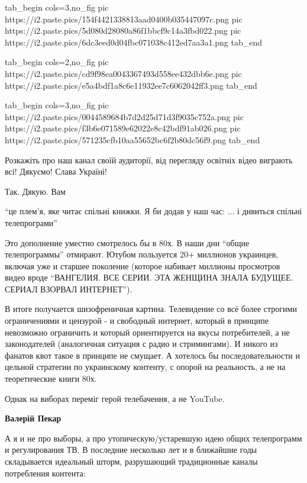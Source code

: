 \begin{itemize}
\ifcmt
  tab_begin cols=3,no_fig
     pic https://i2.paste.pics/154f4421338813aad0400b035447097c.png
		 pic https://i2.paste.pics/5d080d28080a86f1bbcf9c14a3fbd022.png
		 pic https://i2.paste.pics/6dc3eed0d04fbc071038c412ed7aa3a1.png
  tab_end
\fi

\ifcmt
  tab_begin cols=2,no_fig
	   pic https://i2.paste.pics/cd9f98ea0043367493d558ee432dbb6e.png
		 pic https://i2.paste.pics/e5a4bdf1a8c6e11932ee7c6062042ff3.png
  tab_end
\fi

\ifcmt
  tab_begin cols=3,no_fig
		 pic https://i2.paste.pics/0044589684b7d2d25d71d3f9035c752a.png
		 pic https://i2.paste.pics/f3b6e071589e62022e8c42bdf91ab026.png
		 pic https://i2.paste.pics/571235cfb10aa55652bc6f2b80dc56f9.png
  tab_end
\fi

Розкажіть про наш канал своїй аудиторії, від перегляду освітніх відео виграють всі!
Дякуємо!
Слава Україні!

Так. Дякую. Вам


\enquote{це плем'я, яке читає спільні книжки. Я би додав у наш час: ... і дивиться
спільні телепрограми}

Это дополнение уместно смотрелось бы в 80х. В наши дни \enquote{общие телепрограммы}
отмирают. Ютубом пользуется 20+ миллионов украинцев, включая уже и старшее
поколение (которое набивает миллионы просмотров видео вроде \enquote{ВАНГЕЛИЯ. ВСЕ
СЕРИИ. ЭТА ЖЕНЩИНА ЗНАЛА БУДУЩЕЕ. СЕРИАЛ ВЗОРВАЛ ИНТЕРНЕТ}).

В итоге получается шизофреничная картина. Телевидение со всё более строгими
ограничениями и цензурой - и свободный интернет, который в принципе невозможно
ограничить и который ориентируется на вкусы потребителей, а не законодателей
(аналогичная ситуация с радио и стримингами). И никого из фанатов квот такое в
принципе не смущает. А хотелось бы последовательности и цельной стратегии по
украинскому контенту, с опорой на реальность, а не на теоретические книги 80х.

\begin{itemize} %
Однак на виборах переміг герой телебачення, а не YouTube.

\textbf{Валерій Пекар} 

А я и не про выборы, а про утопическую/устаревшую идею общих телепрограмм и
регулирования ТВ. В последние несколько лет и в ближайшие годы складывается
идеальный шторм, разрушающий традиционные каналы потребления контента:


\end{itemize}
\end{itemize}
